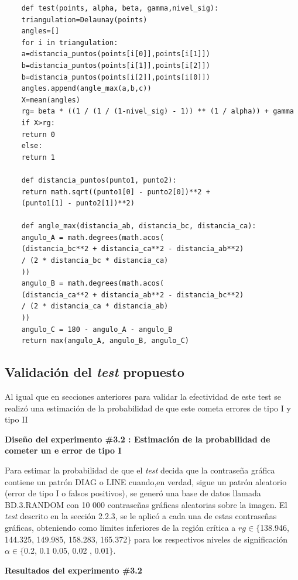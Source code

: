 \documentclass[12pt]{report}
\begin{document}
\begin{lstlisting}
	def test(points, alpha, beta, gamma,nivel_sig):
	triangulation=Delaunay(points)
	angles=[]
	for i in triangulation:
	a=distancia_puntos(points[i[0]],points[i[1]])
	b=distancia_puntos(points[i[1]],points[i[2]])
	b=distancia_puntos(points[i[2]],points[i[0]])
	angles.append(angle_max(a,b,c))     
	X=mean(angles) 
	rg= beta * ((1 / (1 / (1-nivel_sig) - 1)) ** (1 / alpha)) + gamma
	if X>rg:
	return 0
	else:
	return 1
	
	def distancia_puntos(punto1, punto2):
	return math.sqrt((punto1[0] - punto2[0])**2 +
	(punto1[1] - punto2[1])**2)
	
	def angle_max(distancia_ab, distancia_bc, distancia_ca):
	angulo_A = math.degrees(math.acos(
	(distancia_bc**2 + distancia_ca**2 - distancia_ab**2) 
	/ (2 * distancia_bc * distancia_ca)
	))
	angulo_B = math.degrees(math.acos(
	(distancia_ca**2 + distancia_ab**2 - distancia_bc**2) 
	/ (2 * distancia_ca * distancia_ab)
	))
	angulo_C = 180 - angulo_A - angulo_B  
	return max(angulo_A, angulo_B, angulo_C)
\end{lstlisting}

\subsection{Validación del \textit{test} propuesto}
Al igual que en secciones anteriores para validar la efectividad de este test se realizó una estimación de la probabilidad de que este cometa errores de tipo I y tipo II
	 
\textbf{Diseño del experimento \#3.2 : Estimación de la probabilidad de cometer un e error de tipo I} 

Para estimar la probabilidad de que el \textit{test} decida que la contraseña gráfica contiene un patrón DIAG o LINE cuando,en verdad, sigue un patrón aleatorio (error de tipo I o falsos positivos), se generó una base de datos llamada BD.3.RANDOM con 10 000 contraseñas gráficas aleatorias sobre la imagen. El \textit{test} descrito en la sección 2.2.3, se le aplicó a cada una de estas contraseñas gráficas, obteniendo como límites inferiores de la región crítica a $rg \in \{$138.946, 144.325, 149.985, 158.283, 165.372$\}$  para los respectivos  niveles de significación $\alpha \in \{$0.2, 0.1 0.05, 0.02 , 0.01$\}$.



\textbf{Resultados del experimento \#3.2}
\end{document}
